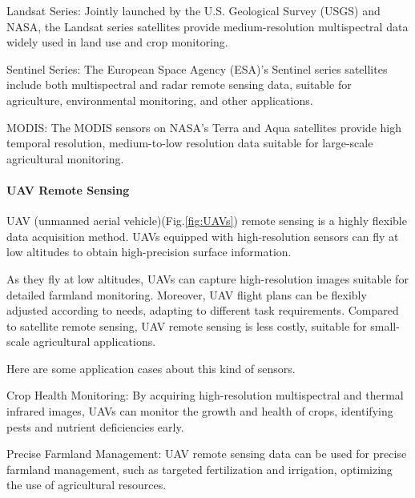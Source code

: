 Landsat Series\cite{Landsatp77:online}: Jointly launched by the U.S. Geological Survey (USGS) and NASA, the Landsat series satellites provide medium-resolution multispectral data widely used in land use and crop monitoring.

Sentinel Series\cite{Sentinel88:online}: The European Space Agency (ESA)'s Sentinel series satellites include both multispectral and radar remote sensing data, suitable for agriculture, environmental monitoring, and other applications.

MODIS\cite{MODISWeb11:online}: The MODIS sensors on NASA's Terra and Aqua satellites provide high temporal resolution, medium-to-low resolution data suitable for large-scale agricultural monitoring.


\paragraph{UAV Remote Sensing}

UAV (unmanned aerial vehicle)\cite{Unmanned27:online}(Fig.\ref{fig:UAVs}) remote sensing is a highly flexible data acquisition method. UAVs equipped with high-resolution sensors can fly at low altitudes to obtain high-precision surface information.

As they fly at low altitudes, UAVs\cite{Unmanned27:online} can capture high-resolution images suitable for detailed farmland monitoring. Moreover, UAV\cite{Unmanned27:online} flight plans can be flexibly adjusted according to needs, adapting to different task requirements. Compared to satellite remote sensing, UAV\cite{Unmanned27:online} remote sensing is less costly, suitable for small-scale agricultural applications.

Here are some application cases about this kind of sensors.

Crop Health Monitoring\cite{javedPerformanceRelationshipFour2021}: By acquiring high-resolution multispectral and thermal infrared images, UAVs\cite{Unmanned27:online} can monitor the growth and health of crops, identifying pests and nutrient deficiencies early.

Precise Farmland Management: UAV\cite{Unmanned27:online} remote sensing data can be used for precise farmland management, such as targeted fertilization and irrigation, optimizing the use of agricultural resources.

